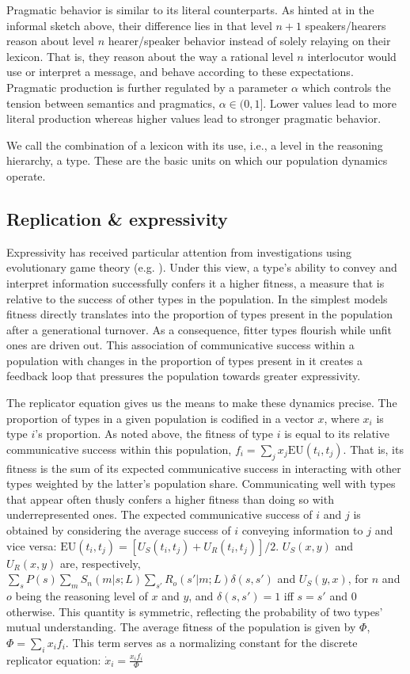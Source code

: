 \documentclass[a4paper]{article}
\begin{document}
Pragmatic behavior is similar to its literal counterparts. As hinted at in the informal sketch above, their difference lies in that level $n+1$ speakers/hearers reason about level $n$ hearer/speaker behavior instead of solely relaying on their lexicon. That is, they reason about the way a rational level $n$ interlocutor would use or interpret a message, and behave according to these expectations. Pragmatic production is further regulated by a parameter $\alpha$ which controls the tension between semantics and pragmatics, $\alpha \in (0,1]$. Lower values lead to more literal production whereas higher values lead to stronger pragmatic behavior. 

We call the combination of a lexicon with its use, i.e., a level in the reasoning hierarchy, a type. These are the basic units on which our population dynamics operate. 

\subsection{Replication \& expressivity}\label{sec:expressivity}
Expressivity has received particular attention from investigations using evolutionary game theory (e.g. \citealt{nowak+krakauer:1999,nowak+etal:2000, nowak+etal:2002}). Under this view, a type's ability to convey and interpret information successfully confers it a higher fitness, a measure that is relative to the success of other types in the population. In the simplest models fitness directly translates into the proportion of types present in the population after a generational turnover. As a consequence, fitter types flourish while unfit ones are driven out. This association of communicative success within a population with changes in the proportion of types present in it creates a feedback loop that pressures the population towards greater expressivity. 

The replicator equation gives us the means to make these dynamics precise. The proportion of types in a given population is codified in a vector $x$, where $x_i$ is type $i$'s proportion. As noted above, the fitness of type $i$ is equal to its relative communicative success within this population, $f_i = \sum_j x_j \text{EU}(t_i,t_j)$. That is, its fitness is the sum of its expected communicative success in interacting with other types weighted by the latter's population share. Communicating well with types that appear often thusly confers a higher fitness than doing so with underrepresented ones. The expected communicative success of $i$ and $j$ is obtained by considering the average success of $i$ conveying information to $j$ and vice versa: $\text{EU}(t_i,t_j) = [U_S(t_i,t_j) + U_R(t_i,t_j)]/2$. $U_S(x,y)$ and $U_R(x,y)$ are, respectively, $\sum_s P(s)\sum_m S_n(m|s;L) \sum_{s'} R_o(s'|m;L) \delta(s,s')$ and $U_S(y,x)$, for $n$ and $o$ being the reasoning level of $x$ and $y$, and $\delta(s,s') = 1$ iff $s = s'$ and $0$ otherwise. This quantity is symmetric, reflecting the probability of two types' mutual understanding. The average fitness of the population is given by $\Phi$, $\Phi = \sum_i x_i f_i$. This term serves as a normalizing constant for the discrete replicator equation: $\dot{x}_i = \frac{x_i f_i}{\Phi}$ 
\end{document}
